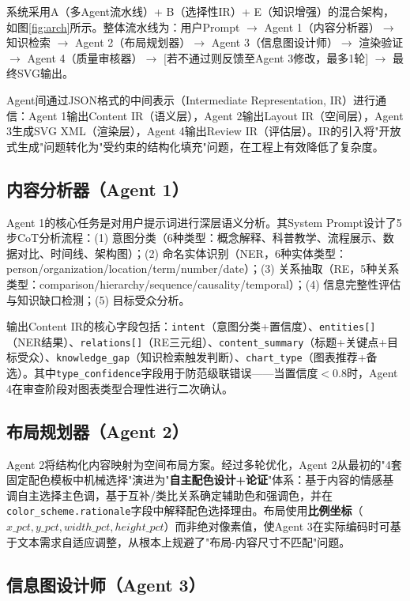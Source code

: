 \documentclass[11pt,a4paper]{article}
\begin{document}
系统采用A（多Agent流水线）+ B（选择性IR）+ E（知识增强）的混合架构，如图\ref{fig:arch}所示。整体流水线为：用户Prompt $\rightarrow$ Agent 1（内容分析器）$\rightarrow$ 知识检索 $\rightarrow$ Agent 2（布局规划器）$\rightarrow$ Agent 3（信息图设计师）$\rightarrow$ 渲染验证 $\rightarrow$ Agent 4（质量审核器）$\rightarrow$ [若不通过则反馈至Agent 3修改，最多1轮] $\rightarrow$ 最终SVG输出。

Agent间通过JSON格式的中间表示（Intermediate Representation, IR）进行通信：Agent 1输出Content IR（语义层），Agent 2输出Layout IR（空间层），Agent 3生成SVG XML（渲染层），Agent 4输出Review IR（评估层）。IR的引入将"开放式生成"问题转化为"受约束的结构化填充"问题，在工程上有效降低了复杂度。

\subsection{内容分析器（Agent 1）}

Agent 1的核心任务是对用户提示词进行深层语义分析。其System Prompt设计了5步CoT分析流程：(1) 意图分类（6种类型：概念解释、科普教学、流程展示、数据对比、时间线、架构图）；(2) 命名实体识别（NER，6种实体类型：person/organization/location/term/number/date）；(3) 关系抽取（RE，5种关系类型：comparison/hierarchy/sequence/causality/temporal）；(4) 信息完整性评估与知识缺口检测；(5) 目标受众分析。

输出Content IR的核心字段包括：\texttt{intent}（意图分类+置信度）、\texttt{entities[]}（NER结果）、\texttt{relations[]}（RE三元组）、\texttt{content\_summary}（标题+关键点+目标受众）、\texttt{knowledge\_gap}（知识检索触发判断）、\texttt{chart\_type}（图表推荐+备选）。其中\texttt{type\_confidence}字段用于防范级联错误——当置信度$<0.8$时，Agent 4在审查阶段对图表类型合理性进行二次确认。

\subsection{布局规划器（Agent 2）}

Agent 2将结构化内容映射为空间布局方案。经过多轮优化，Agent 2从最初的"4套固定配色模板中机械选择"演进为"\textbf{自主配色设计+论证}"体系：基于内容的情感基调自主选择主色调，基于互补/类比关系确定辅助色和强调色，并在\texttt{color\_scheme.rationale}字段中解释配色选择理由。布局使用\textbf{比例坐标}（$x\_pct, y\_pct, width\_pct, height\_pct$）而非绝对像素值，使Agent 3在实际编码时可基于文本需求自适应调整，从根本上规避了"布局-内容尺寸不匹配"问题。

\subsection{信息图设计师（Agent 3）}
\end{document}
